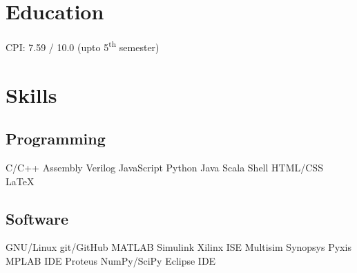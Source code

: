 \documentclass[]{deedy}
\begin{document}
\begin{minipage}[t]{0.27\textwidth}
\begin{flushleft}
%
\section{Education}
%
CPI: 7.59 / 10.0 (upto 5\textsuperscript{th} semester)\\
\sectionsep
%
\sectionsep
%
\sectionsep
\section{Skills}
\subsection{Programming}
C/C++ \textbullet{} Assembly \textbullet{} Verilog \textbullet{} JavaScript \textbullet{} Python \textbullet{} Java \textbullet{} Scala \textbullet{} Shell \textbullet{} HTML/CSS \textbullet{}\\
\LaTeX\ 
%
\subsection{Software}
GNU/Linux \textbullet{} git/GitHub \textbullet{} MATLAB \textbullet{} Simulink \textbullet{} Xilinx ISE \textbullet{} Multisim \textbullet{} Synopsys \textbullet{} Pyxis \textbullet{} MPLAB IDE \textbullet{} Proteus \textbullet{} NumPy/SciPy \textbullet{} Eclipse IDE
%

\end{flushleft}
\end{minipage}
\end{document}
